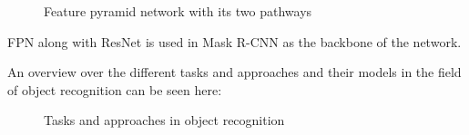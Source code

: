 \begin{figure}[H]
	\caption{\label{fig:fpn} Feature pyramid network with its two pathways}
\end{figure}

FPN along with ResNet is used in Mask R-CNN as the backbone of the network.

An overview over the different tasks and approaches and their models  in the field of object recognition can be seen here:

\begin{figure}[H]
	\caption{\label{fig:object-recognition} Tasks and approaches in object recognition}
\end{figure}

